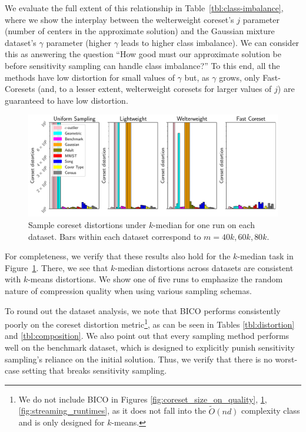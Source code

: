 

We evaluate the full extent of this relationship in Table~\ref{tbl:class-imbalance}, where we show the interplay between the welterweight coreset's $j$
parameter (number of centers in the approximate solution) and the Gaussian mixture dataset's $\gamma$ parameter (higher $\gamma$ leads to higher class
imbalance). We can consider this as answering the question ``How good must our approximate solution be before sensitivity sampling can handle class imbalance?''
To this end, all the methods have low distortion for small values of $\gamma$ but, as $\gamma$ grows, only Fast-Coresets (and, to a lesser extent,
welterweight coresets for larger values of $j$) are guaranteed to have low distortion.

\begin{figure}
    \centering
    \includegraphics[width=\linewidth]{images/1/coreset_distortion-m_scalar_across_all_algorithms.pdf}
    \vspace*{-0.6cm}
    \caption{Sample coreset distortions under $k$-median for one run on each dataset. Bars within each dataset correspond to $m=40k, 60k, 80k$.}
    \label{subfig:kmedian_distortion}
\end{figure}
For completeness, we verify that these results also hold for the $k$-median task in Figure~\ref{subfig:kmedian_distortion}. There, we see that $k$-median
distortions across datasets are consistent with $k$-means distortions. We show one of five runs to emphasize the random nature of compression quality when using
various sampling schemas.

To round out the dataset analysis, we note that BICO performs consistently poorly on the coreset distortion metric\footnote{We do not include BICO in Figures
\ref{fig:coreset_size_on_quality}, \ref{subfig:kmedian_distortion}, \ref{fig:streaming_runtimes},  as it does not fall into the $\tilde{O}(nd)$ complexity class
and is only designed for $k$-means.}, as can be seen in Tables \ref{tbl:distortion} and \ref{tbl:composition}. We also point out that every sampling method
performs well on the benchmark dataset, which is designed to explicitly punish sensitivity sampling's reliance on the initial solution. Thus, we verify that
there is no worst-case setting that breaks sensitivity sampling.

